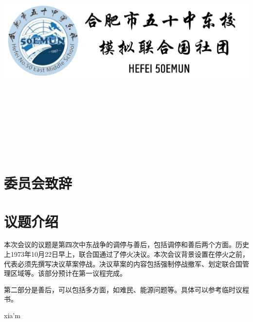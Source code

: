\documentclass{article}
\begin{document}
    \begin{titlepage}
    \begin{center}
        \includegraphics{./50mun.png}\\
        \begin{flushleft}
            \vspace*{3em}
            \\
            \\
            \vspace*{6em}
            \centering{}
            \\
            \vspace*{3em}
            \centering{}\\
            \vspace*{5em}
            \centering{}
            \\
            \vspace*{3em}
            \centering{}\\
            \vspace*{3em}
            \centering{}\\
            \vspace*{3em}
            \centering{}
        \end{flushleft}
    \end{center}
    \end{titlepage}
    \clearpage
    \tableofcontents
    \clearpage
    \section{委员会致辞}
    \clearpage
    \section{议题介绍}
        本次会议的议题是第四次中东战争的调停与善后，包括调停和善后两个方面。历史上1973年10月22日早上，联合国通过了停火决议。本次会议背景设置在停火之前，代表必须先撰写决议草案停战。决议草案的内容包括强制停战撤军、划定联合国管理区域等。该部分预计在第一议程完成。

        第二部分是善后，可以包括多方面，如难民、能源问题等。具体可以参考临时议程书。

        xia'm
\end{document}
